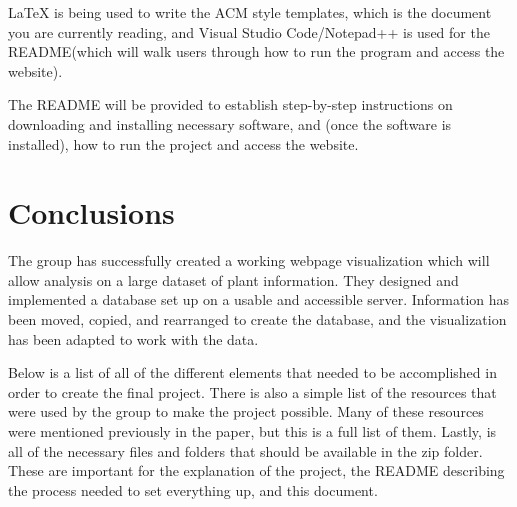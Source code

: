 \documentclass{Group6_Phase2}
\begin{document}
LaTeX is being used to write the ACM style templates, which is the document you are currently reading, and Visual Studio Code/Notepad++ is used for the README(which will walk users through how to run the program and access the website).

The README will be provided to establish step-by-step instructions on downloading and installing necessary software, and (once the software is installed), how to run the project and access the website. 


\section{Conclusions}
The group has successfully created a working webpage visualization which will allow analysis on a large dataset of plant information. They designed and implemented a database set up on a usable and accessible server. Information has been moved, copied, and rearranged to create the database, and the visualization has been adapted to work with the data.

Below is a list of all of the different elements that needed to be accomplished in order to create the final project. There is also a simple list of the resources that were used by the group to make the project possible. Many of these resources were mentioned previously in the paper, but this is a full list of them. Lastly, is all of the necessary files and folders that should be available in the zip folder. These are important for the explanation of the project, the README describing the process needed to set everything up, and this document.
\end{document}
